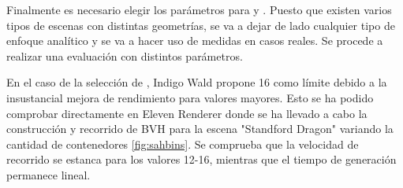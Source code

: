 Finalmente es necesario elegir los parámetros para  y . Puesto que existen varios tipos de escenas con distintas geometrías, se va a dejar de lado cualquier tipo de enfoque analítico y se va a hacer uso de medidas en casos reales. Se procede a realizar una evaluación con distintos parámetros.
	
En el caso de la selección de , Indigo Wald propone 16 como límite \cite{wald2007fast} debido a la insustancial mejora de rendimiento para valores mayores. Esto se ha podido comprobar directamente en Eleven Renderer donde se ha llevado a cabo la construcción y recorrido de BVH para la escena "Standford Dragon" variando la cantidad de contenedores \autoref{fig:sahbins}. Se comprueba que la velocidad de recorrido se estanca para los valores 12-16, mientras que el tiempo de generación permanece lineal.

\begin{figure}[H]
\centering
{}
\end{figure}